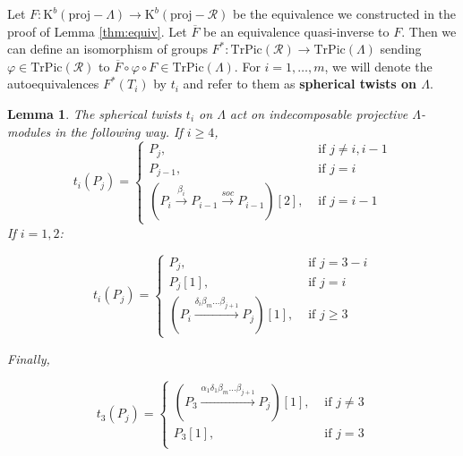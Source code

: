 \documentclass[12pt]{amsart}
\theoremstyle{plain}
\newtheorem{lemma}{Lemma}%
\theoremstyle{remark}
\theoremstyle{definition}
\newcommand{\proj}{{\mathrm{proj}}}
\newcommand{\TrPic}{{\mathrm{TrPic}}}
\newcommand{\K}{{\mathrm{K}}}
\begin{document}
Let $F \colon \K^b(\proj-\Lambda) \to \K^b(\proj-\mathcal{R})$ be the equivalence we constructed in the proof of Lemma \ref{thm:equiv}. Let $\overline{F}$ be an equivalence quasi-inverse to $F$. Then we can define an isomorphism of groups ${F^* \colon \TrPic(\mathcal{R}) \to \TrPic(\Lambda)}$ sending $\varphi \in \TrPic(\mathcal{R})$ to $\overline{F} \circ \varphi \circ F  \in \TrPic(\Lambda)$. For $i=1, \dots, m$, we will denote the autoequivalences $F^*(T_i)$ by $t_i$ and refer to them as {\bf spherical twists on $\Lambda$}. 
\begin{lemma}\label{thm:twonLambda} The spherical twists $t_i$ on $\Lambda$ act on indecomposable projective $\Lambda$-modules in the following way. If $i \geq 4$, 
$$t_i(P_j) =
\begin{cases}
P_j, &\text{ if } j \neq i, i-1\\
P_{j-1},  &\text{ if } j=i\\
(P_i \xrightarrow{\beta_i} P_{i-1} \xrightarrow{soc} P_{i-1})[2],  &\text{ if } j = i-1
\end{cases}
$$ 
If $i=1,2$:

$$
t_i(P_j) =
\begin{cases}
P_j, & \text{ if } j = 3-i\\
P_j[1], & \text{ if } j=i\\
(P_i \xrightarrow{\delta_i\beta_m \dots \beta_{j+1}} P_j)[1], & \text{ if } j \geq 3
\end{cases}
$$ 

Finally, 

$$
t_3(P_j) =
\begin{cases}
(P_3 \xrightarrow{\alpha_1\delta_1\beta_m \dots \beta_{j+1}} P_j)[1], & \text{ if } j \neq 3\\
P_3[1], &\text{ if }  j=3\\
\end{cases}
$$ \end{lemma} 
\end{document}

